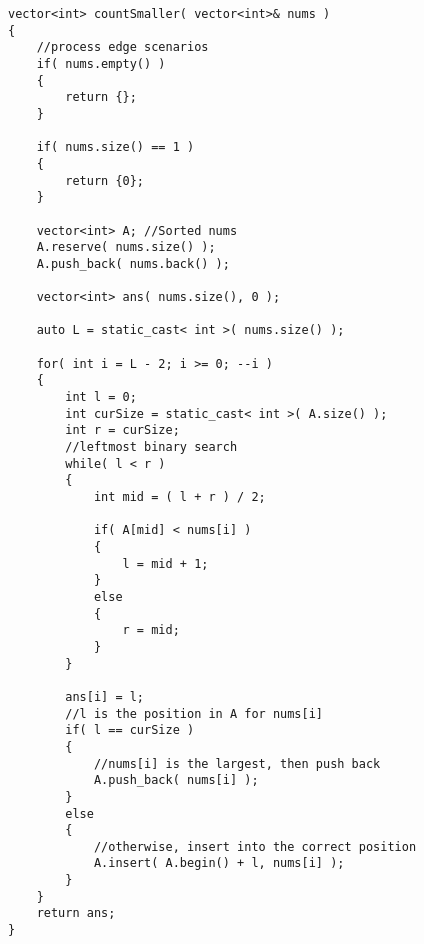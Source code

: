 \begin{lstlisting}[style=customc, caption={Binary Search And Sorting}]
vector<int> countSmaller( vector<int>& nums )
{
    //process edge scenarios
    if( nums.empty() )
    {
        return {};
    }

    if( nums.size() == 1 )
    {
        return {0};
    }

    vector<int> A; //Sorted nums
    A.reserve( nums.size() );
    A.push_back( nums.back() );

    vector<int> ans( nums.size(), 0 );

    auto L = static_cast< int >( nums.size() );

    for( int i = L - 2; i >= 0; --i )
    {
        int l = 0;
        int curSize = static_cast< int >( A.size() );
        int r = curSize;
        //leftmost binary search
        while( l < r )
        {
            int mid = ( l + r ) / 2;

            if( A[mid] < nums[i] )
            {
                l = mid + 1;
            }
            else
            {
                r = mid;
            }
        }

        ans[i] = l;
        //l is the position in A for nums[i]
        if( l == curSize )
        {
            //nums[i] is the largest, then push back
            A.push_back( nums[i] );
        }
        else
        {
            //otherwise, insert into the correct position
            A.insert( A.begin() + l, nums[i] );
        }
    }
    return ans;
}
\end{lstlisting}